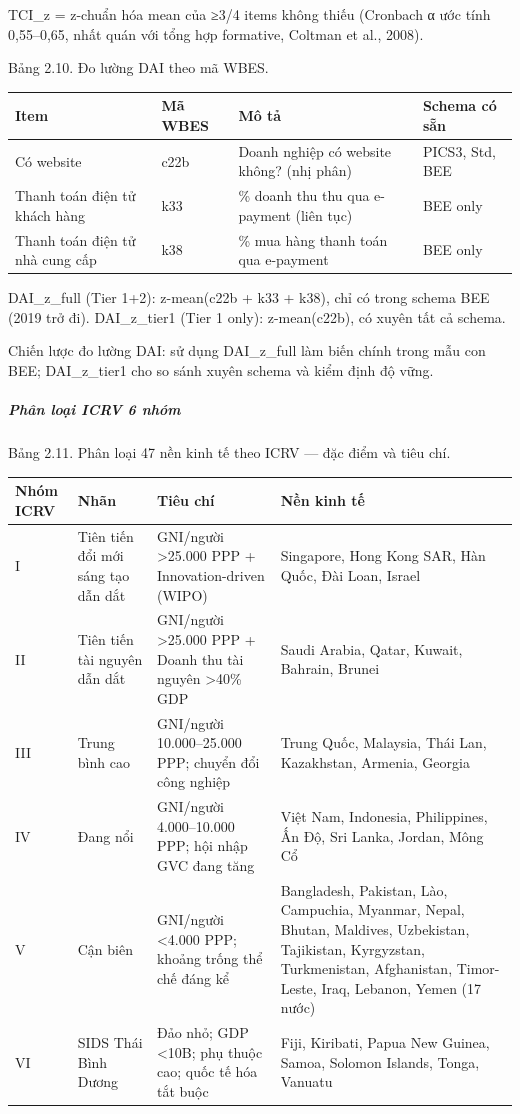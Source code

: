 \documentclass[12pt,a4paper]{article}
\begin{document}
TCI\_z = z-chuẩn hóa mean của ≥3/4 items không thiếu (Cronbach α ước
tính 0,55--0,65, nhất quán với tổng hợp formative, Coltman et al.,
2008).

Bảng 2.10. Đo lường DAI theo mã WBES.

\begin{longtable}[]{@{}llll@{}}
\toprule\noalign{}
Item & Mã WBES & Mô tả & Schema có sẵn \\
\midrule\noalign{}
\endhead
\bottomrule\noalign{}
\endlastfoot
Có website & c22b & Doanh nghiệp có website không? (nhị phân) & PICS3,
Std, BEE \\
Thanh toán điện tử khách hàng & k33 & \% doanh thu thu qua e-payment
(liên tục) & BEE only \\
Thanh toán điện tử nhà cung cấp & k38 & \% mua hàng thanh toán qua
e-payment & BEE only \\
\end{longtable}

DAI\_z\_full (Tier 1+2): z-mean(c22b + k33 + k38), chỉ có trong schema
BEE (2019 trở đi). DAI\_z\_tier1 (Tier 1 only): z-mean(c22b), có xuyên
tất cả schema.

Chiến lược đo lường DAI: sử dụng DAI\_z\_full làm biến chính trong mẫu
con BEE; DAI\_z\_tier1 cho so sánh xuyên schema và kiểm định độ vững.

\hypertarget{phuxe2n-loux1ea1i-icrv-6-nhuxf3m}{%
\subparagraph{Phân loại ICRV 6
nhóm}\label{phuxe2n-loux1ea1i-icrv-6-nhuxf3m}}

Bảng 2.11. Phân loại 47 nền kinh tế theo ICRV --- đặc điểm và tiêu chí.

\begin{longtable}[]{@{}llll@{}}
\toprule\noalign{}
Nhóm ICRV & Nhãn & Tiêu chí & Nền kinh tế \\
\midrule\noalign{}
\endhead
\bottomrule\noalign{}
\endlastfoot
I & Tiên tiến đổi mới sáng tạo dẫn dắt & GNI/người \textgreater25.000
PPP + Innovation-driven (WIPO) & Singapore, Hong Kong SAR, Hàn Quốc, Đài
Loan, Israel \\
II & Tiên tiến tài nguyên dẫn dắt & GNI/người \textgreater25.000 PPP +
Doanh thu tài nguyên \textgreater40\% GDP & Saudi Arabia, Qatar, Kuwait,
Bahrain, Brunei \\
III & Trung bình cao & GNI/người 10.000--25.000 PPP; chuyển đổi công
nghiệp & Trung Quốc, Malaysia, Thái Lan, Kazakhstan, Armenia, Georgia \\
IV & Đang nổi & GNI/người 4.000--10.000 PPP; hội nhập GVC đang tăng &
Việt Nam, Indonesia, Philippines, Ấn Độ, Sri Lanka, Jordan, Mông Cổ \\
V & Cận biên & GNI/người \textless4.000 PPP; khoảng trống thể chế đáng
kể & Bangladesh, Pakistan, Lào, Campuchia, Myanmar, Nepal, Bhutan,
Maldives, Uzbekistan, Tajikistan, Kyrgyzstan, Turkmenistan, Afghanistan,
Timor-Leste, Iraq, Lebanon, Yemen (17 nước) \\
VI & SIDS Thái Bình Dương & Đảo nhỏ; GDP \textless10B; phụ thuộc cao;
quốc tế hóa tắt buộc & Fiji, Kiribati, Papua New Guinea, Samoa, Solomon
Islands, Tonga, Vanuatu \\
\end{longtable}
\end{document}
